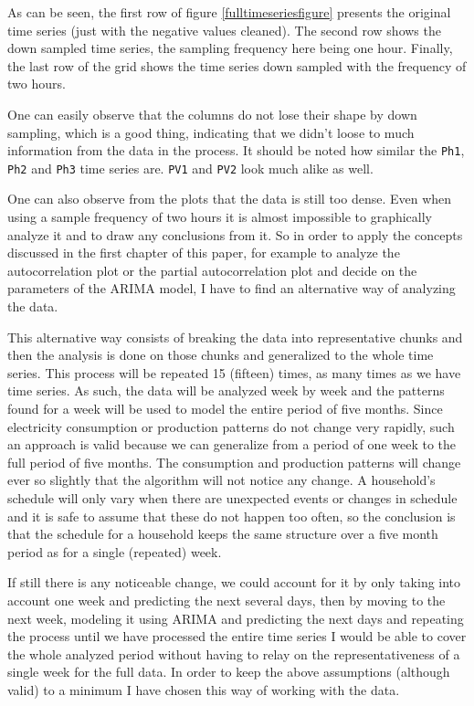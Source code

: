 \documentclass[12pt,a4paper,titlepage]{report}
\begin{document}
As can be seen, the first row of figure \ref{fulltimeseriesfigure} presents the original time series (just with the negative values cleaned).
The second row shows the down sampled time series, the sampling frequency here being one hour. Finally, the last row of the grid shows the time series down sampled with the frequency of two hours.

One can easily observe that the columns do not lose their shape by down sampling, which is a good thing, indicating that we didn't loose to much information from the data in the process. It should be noted how similar the \texttt{Ph1}, \texttt{Ph2} and \texttt{Ph3} time series are. \texttt{PV1} and \texttt{PV2} look much alike as well.

One can also observe from the plots that the data is still too dense. Even when using a sample frequency of two hours it is almost impossible to graphically analyze it and to draw any conclusions from it. So in order to apply the concepts discussed in the first chapter of this paper, for example to analyze the autocorrelation plot or the partial autocorrelation plot and decide on the parameters of the ARIMA model, I have to find an alternative way of analyzing the data.

This alternative way consists of breaking the data into representative chunks and then the analysis is done on those chunks and generalized to the whole time series. This process will be repeated 15 (fifteen) times, as many times as we have time series. As such, the data will be analyzed week by week and the patterns found for a week will be used to model the entire period of five months. Since electricity consumption or production patterns do not change very rapidly, such an approach is valid because we can generalize from a period of one week to the full period of five months. The consumption and production patterns will change ever so slightly that the algorithm will not notice any change. A household's schedule will only vary when there are unexpected events or changes in schedule and it is safe to assume that these do not happen too often, so the conclusion is that the schedule for a household keeps the same structure over a five month period as for a single (repeated) week.

If still there is any noticeable change, we could account for it by only taking into account one week and predicting the next several days, then by moving to the next week, modeling it using ARIMA and predicting the next days and repeating the process until we have processed the entire time series I would be able to cover the whole analyzed period without having to relay on the representativeness of a single week for the full data. In order to keep the above assumptions (although valid) to a minimum I have chosen this way of working with the data.
\end{document}
